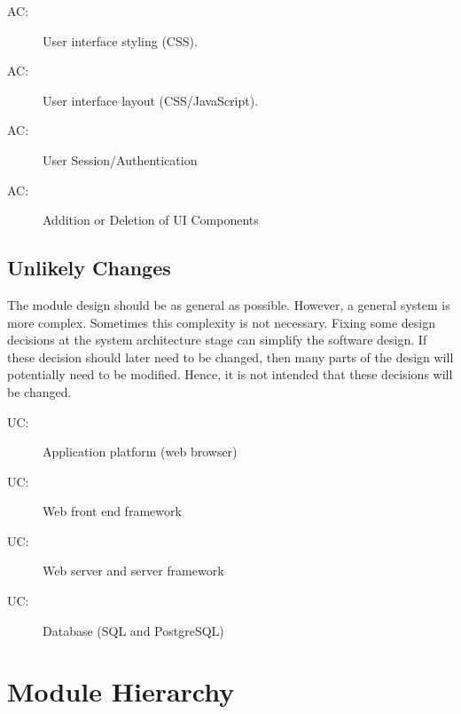 \documentclass[12pt, titlepage]{article}
\newcounter{acnum}
\newcommand{\actheacnum}{AC\theacnum}
\newcounter{ucnum}
\newcommand{\uctheucnum}{UC\theucnum}
\begin{document}
\begin{description}
\item[ \actheacnum \label{acUILooks}:] User interface
  styling (CSS).

\item[ \actheacnum \label{acUILooks}:] User interface
  layout (CSS/JavaScript).

\item[ \actheacnum \label{acUILooks}:] User
    Session/Authentication

\item[ \actheacnum \label{acUILooks}:] Addition or
    Deletion of UI Components
\end{description}

\subsection{Unlikely Changes} \label{SecUchange}

The module design should be as general as possible. However, a general system is
more complex. Sometimes this complexity is not necessary. Fixing some design
decisions at the system architecture stage can simplify the software design. If
these decision should later need to be changed, then many parts of the design
will potentially need to be modified. Hence, it is not intended that these
decisions will be changed.

\begin{description}
    \item[ \uctheucnum \label{ucIO}:] Application
        platform (web browser)

    \item[ \uctheucnum \label{ucIO}:] Web front end
        framework

    \item[ \uctheucnum \label{ucIO}:] Web server and
        server framework

    \item[ \uctheucnum \label{ucIO}:] Database (SQL and
        PostgreSQL)
\end{description}

\section{Module Hierarchy} \label{SecMH}
\end{document}
